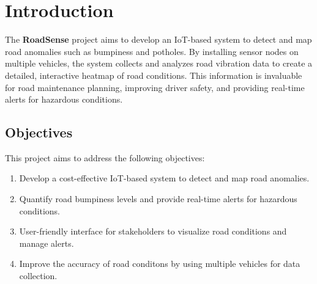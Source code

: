 \section{Introduction}

The \textbf{RoadSense} project aims to develop an IoT-based system to detect and map road anomalies such as bumpiness and potholes. 
By installing sensor nodes on multiple vehicles, the system collects and analyzes road vibration data to create a detailed, interactive heatmap of road conditions. 
This information is invaluable for road maintenance planning, improving driver safety, and providing real-time alerts for hazardous conditions.

\subsection{Objectives}

This project aims to address the following objectives:

\begin{enumerate}
\item Develop a cost-effective IoT-based system to detect and map road anomalies.
\item Quantify road bumpiness levels and provide real-time alerts for hazardous conditions.
\item User-friendly interface for stakeholders to visualize road conditions and manage alerts.
\item Improve the accuracy of road conditons by using multiple vehicles for data collection.
\end{enumerate}